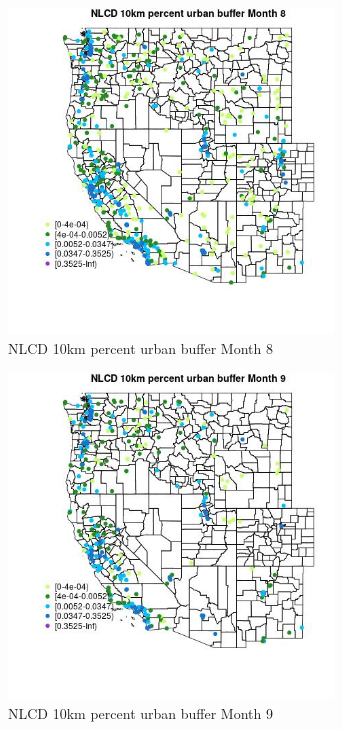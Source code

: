 \begin{figure} 
\centering  
\includegraphics[width=0.77\textwidth]{Code_Outputs/Report_ML_input_PM25_Step4_part_e_de_duplicated_aves_compiled_2019-05-18wNAs_MapObsMo8NLCD_10km_percent_urban_buffer.jpg} 
\caption{\label{fig:Report_ML_input_PM25_Step4_part_e_de_duplicated_aves_compiled_2019-05-18wNAsMapObsMo8NLCD_10km_percent_urban_buffer}NLCD 10km percent urban buffer Month 8} 
\end{figure} 
 

\clearpage 

\begin{figure} 
\centering  
\includegraphics[width=0.77\textwidth]{Code_Outputs/Report_ML_input_PM25_Step4_part_e_de_duplicated_aves_compiled_2019-05-18wNAs_MapObsMo9NLCD_10km_percent_urban_buffer.jpg} 
\caption{\label{fig:Report_ML_input_PM25_Step4_part_e_de_duplicated_aves_compiled_2019-05-18wNAsMapObsMo9NLCD_10km_percent_urban_buffer}NLCD 10km percent urban buffer Month 9} 
\end{figure} 
 
